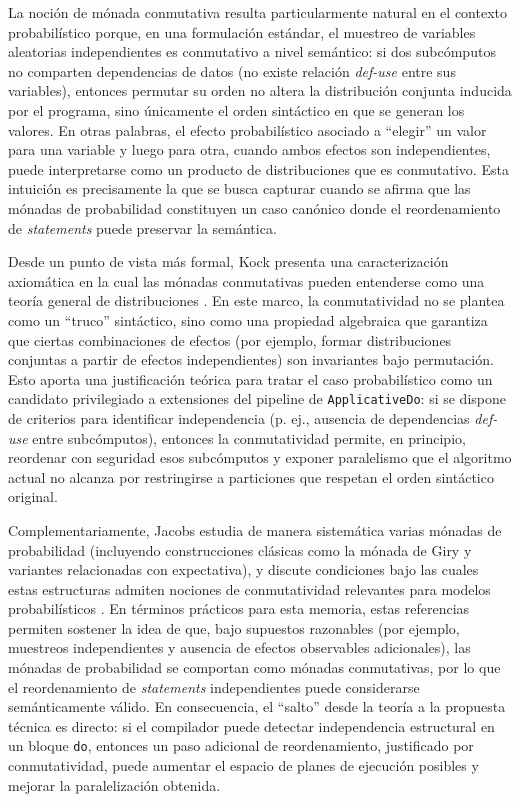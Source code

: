 La noción de mónada conmutativa resulta particularmente natural en el contexto probabilístico porque, en una formulación estándar, el muestreo de variables aleatorias independientes es conmutativo a nivel semántico: si dos subcómputos no comparten dependencias de datos (no existe relación \textit{def-use} entre sus variables), entonces permutar su orden no altera la distribución conjunta inducida por el programa, sino únicamente el orden sintáctico en que se generan los valores. En otras palabras, el efecto probabilístico asociado a ``elegir'' un valor para una variable y luego para otra, cuando ambos efectos son independientes, puede interpretarse como un producto de distribuciones que es conmutativo. Esta intuición es precisamente la que se busca capturar cuando se afirma que las mónadas de probabilidad constituyen un caso canónico donde el reordenamiento de \textit{statements} puede preservar la semántica.

Desde un punto de vista más formal, Kock presenta una caracterización axiomática en la cual las mónadas conmutativas pueden entenderse como una teoría general de distribuciones \cite{Kock2012}. En este marco, la conmutatividad no se plantea como un ``truco'' sintáctico, sino como una propiedad algebraica que garantiza que ciertas combinaciones de efectos (por ejemplo, formar distribuciones conjuntas a partir de efectos independientes) son invariantes bajo permutación. Esto aporta una justificación teórica para tratar el caso probabilístico como un candidato privilegiado a extensiones del pipeline de \texttt{ApplicativeDo}: si se dispone de criterios para identificar independencia (p. ej., ausencia de dependencias \textit{def-use} entre subcómputos), entonces la conmutatividad permite, en principio, reordenar con seguridad esos subcómputos y exponer paralelismo que el algoritmo actual no alcanza por restringirse a particiones que respetan el orden sintáctico original.

\newpage

Complementariamente, Jacobs estudia de manera sistemática varias mónadas de probabilidad (incluyendo construcciones clásicas como la mónada de Giry y variantes relacionadas con expectativa), y discute condiciones bajo las cuales estas estructuras admiten nociones de conmutatividad relevantes para modelos probabilísticos \cite{Jacobs2018}. En términos prácticos para esta memoria, estas referencias permiten sostener la idea de que, bajo supuestos razonables (por ejemplo, muestreos independientes y ausencia de efectos observables adicionales), las mónadas de probabilidad se comportan como mónadas conmutativas, por lo que el reordenamiento de \textit{statements} independientes puede considerarse semánticamente válido. En consecuencia, el ``salto'' desde la teoría a la propuesta técnica es directo: si el compilador puede detectar independencia estructural en un bloque \texttt{do}, entonces un paso adicional de reordenamiento, justificado por conmutatividad, puede aumentar el espacio de planes de ejecución posibles y mejorar la paralelización obtenida.


